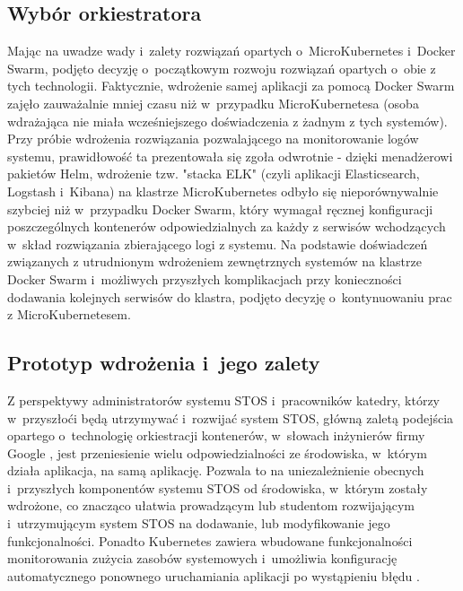 \subsection{Wybór orkiestratora}
Mając na uwadze wady i~zalety rozwiązań opartych o~MicroKubernetes i~Docker Swarm, podjęto decyzję o~początkowym rozwoju rozwiązań opartych o~obie z tych technologii. Faktycznie, wdrożenie samej aplikacji za pomocą Docker Swarm zajęło zauważalnie mniej czasu niż w~przypadku MicroKubernetesa (osoba wdrażająca nie miała wcześniejszego doświadczenia z żadnym z tych systemów). Przy próbie wdrożenia rozwiązania pozwalającego na monitorowanie logów systemu, prawidłowość ta prezentowała się zgoła odwrotnie - dzięki menadżerowi pakietów Helm, wdrożenie tzw. "stacka ELK" (czyli aplikacji Elasticsearch, Logstash i~Kibana) na klastrze MicroKubernetes odbyło się nieporównywalnie szybciej niż w~przypadku Docker Swarm, który wymagał ręcznej konfiguracji poszczególnych kontenerów odpowiedzialnych za każdy z serwisów wchodzących w~skład rozwiązania zbierającego logi z systemu. Na podstawie doświadczeń związanych z utrudnionym wdrożeniem zewnętrznych systemów na klastrze Docker Swarm i~możliwych przyszłych komplikacjach przy konieczności dodawania kolejnych serwisów do klastra, podjęto decyzję o~kontynuowaniu prac z MicroKubernetesem.

\subsection{Prototyp wdrożenia i~jego zalety}
Z perspektywy administratorów systemu STOS i~pracowników katedry, którzy w~przyszłoći będą utrzymywać i~rozwijać system STOS, główną zaletą podejścia opartego o~technologię orkiestracji kontenerów, w~słowach inżynierów firmy Google \cite{googleKubernetes}, jest przeniesienie wielu odpowiedzialności ze środowiska, w~którym działa aplikacja, na samą aplikację. Pozwala to na uniezależnienie obecnych i~przyszłych komponentów systemu STOS od środowiska, w~którym zostały wdrożone, co znacząco ułatwia prowadzącym lub studentom rozwijającym i~utrzymującym system STOS na dodawanie, lub modyfikowanie jego funkcjonalności. Ponadto Kubernetes zawiera wbudowane funkcjonalności monitorowania zużycia zasobów systemowych i~umożliwia konfigurację automatycznego ponownego uruchamiania aplikacji po wystąpieniu błędu \cite{k8sPod}.

